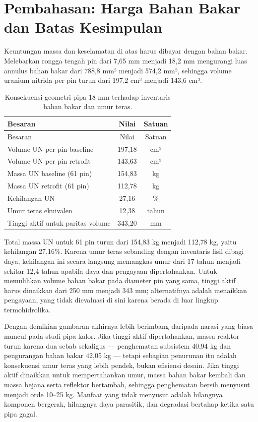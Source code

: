 \documentclass[
  indonesian,
  12pt,
  a4paper,
]{report}
\begin{document}
\section{Pembahasan: Harga Bahan Bakar dan Batas
Kesimpulan}\label{pembahasan-harga-bahan-bakar-dan-batas-kesimpulan}

Keuntungan massa dan keselamatan di atas harus dibayar dengan bahan
bakar. Melebarkan rongga tengah pin dari 7,65 mm menjadi 18,2 mm
mengurangi luas annulus bahan bakar dari 788,8 mm² menjadi 574,2 mm²,
sehingga volume uranium nitrida per pin turun dari 197,2 cm³ menjadi
143,6 cm³.

\begin{longtable}[]{@{}lcc@{}}
\caption{Konsekuensi geometri pipa 18 mm terhadap inventaris bahan bakar
dan umur teras.}\label{tbl-bahan-bakar}\tabularnewline
\toprule\noalign{}
Besaran & Nilai & Satuan \\
\midrule\noalign{}
\endfirsthead
\toprule\noalign{}
Besaran & Nilai & Satuan \\
\midrule\noalign{}
\endhead
\bottomrule\noalign{}
\endlastfoot
Volume UN per pin baseline & 197,18 & cm³ \\
Volume UN per pin retrofit & 143,63 & cm³ \\
Massa UN baseline (61 pin) & 154,83 & kg \\
Massa UN retrofit (61 pin) & 112,78 & kg \\
Kehilangan UN & 27,16 & \% \\
Umur teras ekuivalen & 12,38 & tahun \\
Tinggi aktif untuk paritas volume & 343,20 & mm \\
\end{longtable}

Total massa UN untuk 61 pin turun dari 154,83 kg menjadi 112,78 kg,
yaitu kehilangan 27,16\%. Karena umur teras sebanding dengan inventaris
fisil dibagi daya, kehilangan ini secara langsung memangkas umur dari 17
tahun menjadi sekitar 12,4 tahun apabila daya dan pengayaan
dipertahankan. Untuk memulihkan volume bahan bakar pada diameter pin
yang sama, tinggi aktif harus dinaikkan dari 250 mm menjadi 343 mm;
alternatifnya adalah menaikkan pengayaan, yang tidak dievaluasi di sini
karena berada di luar lingkup termohidrolika.

Dengan demikian gambaran akhirnya lebih berimbang daripada narasi yang
biasa muncul pada studi pipa kalor. Jika tinggi aktif dipertahankan,
massa reaktor turun karena dua sebab sekaligus --- penghematan subsistem
40,94 kg dan pengurangan bahan bakar 42,05 kg --- tetapi sebagian
penurunan itu adalah konsekuensi umur teras yang lebih pendek, bukan
efisiensi desain. Jika tinggi aktif dinaikkan untuk mempertahankan umur,
massa bahan bakar kembali dan massa bejana serta reflektor bertambah,
sehingga penghematan bersih menyusut menjadi orde 10--25 kg. Manfaat
yang tidak menyusut adalah hilangnya komponen bergerak, hilangnya daya
parasitik, dan degradasi bertahap ketika satu pipa gagal.
\end{document}
